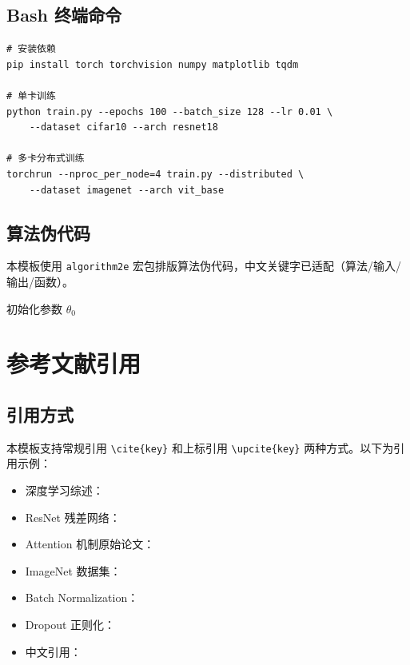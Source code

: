 \documentclass{harryopo-paper}
\begin{document}
\subsection{Bash 终端命令}

\begin{lstlisting}[style=bashstyle, caption={训练命令示例}, label=lst:bash]
# 安装依赖
pip install torch torchvision numpy matplotlib tqdm

# 单卡训练
python train.py --epochs 100 --batch_size 128 --lr 0.01 \
    --dataset cifar10 --arch resnet18

# 多卡分布式训练
torchrun --nproc_per_node=4 train.py --distributed \
    --dataset imagenet --arch vit_base
\end{lstlisting}

\subsection{算法伪代码}

本模板使用 \texttt{algorithm2e} 宏包排版算法伪代码，中文关键字已适配（算法/输入/输出/函数）。

\begin{algorithm}[htbp]
\caption{梯度下降优化算法}
\label{alg:sgd}
\SetKwFunction{GradLoss}{Grad}
\BlankLine
初始化参数 $\theta_0$\;
\end{algorithm}

\section{参考文献引用}
\label{sec:cite}

\subsection{引用方式}

本模板支持常规引用 \verb|\cite{key}| 和上标引用 \verb|\upcite{key}| 两种方式。以下为引用示例：

\begin{itemize}
    \item 深度学习综述：\cite{lecun2015deep}
    \item ResNet 残差网络：\cite{he2016deep}
    \item Attention 机制原始论文：\cite{vaswani2017attention}
    \item ImageNet 数据集：\cite{deng2009imagenet}
    \item Batch Normalization：\cite{ioffe2015batch}
    \item Dropout 正则化：\cite{srivastava2014dropout}
    \item 中文引用：\cite{zhou2016machine}
\end{itemize}
\end{document}
